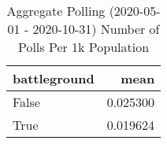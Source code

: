 \begin{table}
\centering
\caption{Aggregate Polling (2020-05-01 - 2020-10-31) Number of Polls Per 1k Population}
\begin{tabular}{lr}
\toprule
 battleground &      mean \\
\midrule
        False &  0.025300 \\
         True &  0.019624 \\
\bottomrule
\end{tabular}
\end{table}
